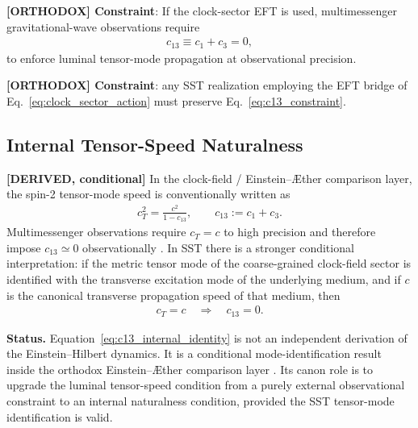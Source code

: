 \documentclass[11pt]{article}
\theoremstyle{definition}
\theoremstyle{plain}
\theoremstyle{remark}
\begin{document}
        \textbf{[ORTHODOX] Constraint}: If the clock-sector EFT is used, multimessenger gravitational-wave
        observations require \cite{Monitor2017}
        \begin{align}
            c_{13} \equiv c_1 + c_3 = 0,
            \label{eq:c13_constraint}
        \end{align}
        to enforce luminal tensor-mode propagation at observational precision.

        \textbf{[ORTHODOX] Constraint}: any SST realization employing the EFT bridge of Eq.~\eqref{eq:clock_sector_action}
        must preserve Eq.~\eqref{eq:c13_constraint}.

    \subsection{Internal Tensor-Speed Naturalness}
    \label{subsec:tensor_speed_naturalness}

        \textbf{[DERIVED, conditional]} In the clock-field / Einstein--\AE ther
        comparison layer, the spin-2 tensor-mode speed is conventionally written as
        \begin{align}
            c_T^2
            =
            \frac{c^2}{1-c_{13}},
            \qquad
            c_{13}:=c_1+c_3 .
            \label{eq:eaether_tensor_speed}
        \end{align}
        Multimessenger observations require \(c_T=c\) to high precision and therefore
        impose \(c_{13}\simeq 0\) observationally \cite{Monitor2017,Abbott2017GW170817}. In SST there is a stronger conditional
        interpretation: if the metric tensor mode of the coarse-grained clock-field
        sector is identified with the transverse excitation mode of the underlying
        medium, and if \(c\) is the canonical transverse propagation speed of that
        medium, then
        \begin{align}
            c_T=c
            \quad\Longrightarrow\quad
            c_{13}=0 .
            \label{eq:c13_internal_identity}
        \end{align}

        \textbf{Status.} Equation~\eqref{eq:c13_internal_identity} is not an
        independent derivation of the Einstein--Hilbert dynamics. It is a conditional
        mode-identification result inside the orthodox Einstein--\AE ther comparison
        layer \cite{JacobsonMattingly2001,FosterJacobson2006}. Its canon role is to upgrade the luminal tensor-speed condition from a
        purely external observational constraint to an internal naturalness condition,
        provided the SST tensor-mode identification is valid.
\end{document}
